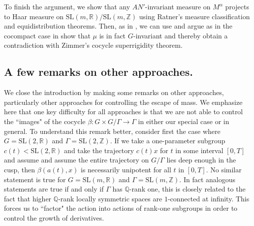 \documentclass[10pt,reqno]{amsart}
\theoremstyle{Theorem}
\theoremstyle{definition}
\theoremstyle{remark}
\newcommand{\R}{\mathbb {R}}
\newcommand{\Q}{\mathbb {Q}}
\newcommand{\Z}{\mathbb {Z}}
\newcommand{\Sl}{\mathrm{SL}}
\begin{document}
To finish the argument, we show that any $AN'$-invariant measure on $M^{\alpha}$ projects to Haar measure on $\Sl(m,\R)/\Sl(m,\Z)$ using  Ratner's measure classification and equidistribution theorems.  Then, as in \cite{BFH}, we can use \cite[Proposition 5.1]{AWBFRHZW-latticemeasure} and argue as in the cocompact case in \cite{BFH} show that  $\mu$ is in fact $G$-invariant and thereby obtain a contradiction with Zimmer's cocycle superrigidity theorem.

\subsection{A few remarks on other approaches.}
 \label{subsection:failure}

 We close the introduction by making some remarks on other approaches, particularly other approaches for controlling the  escape of mass.  We emphasize here that one key difficulty for all approaches is that we are not able to control the ``images" of the cocycle $\beta\colon G \times G/\Gamma \rightarrow \Gamma$ in either our special case or in general. To understand this remark better, consider first the case where $G=\Sl(2,\R)$ and $\Gamma =\Sl(2,\Z)$. If we take a one-parameter subgroup $c(t)<\Sl(2,\R)$ and take the trajectory $c(t)x$ for $t$ in some interval $[0,T]$ and assume and assume the entire trajectory on $G/\Gamma$ lies deep enough in the cusp, then $\beta(a(t),x)$ is necessarily unipotent for all $t$ in $[0,T]$.  No similar statement is true for $G=\Sl(m,\R)$ and $\Gamma=\Sl(m,\Z)$.  In fact analogous statements are true if and only if $\Gamma$ has $\Q$-rank one, this is closely related to the fact that higher $\Q$-rank locally symmetric spaces are $1$-connected at infinity.  This forces us to ``factor" the action into actions of rank-one subgroups in order to  control the growth of derivatives.

\end{document}
